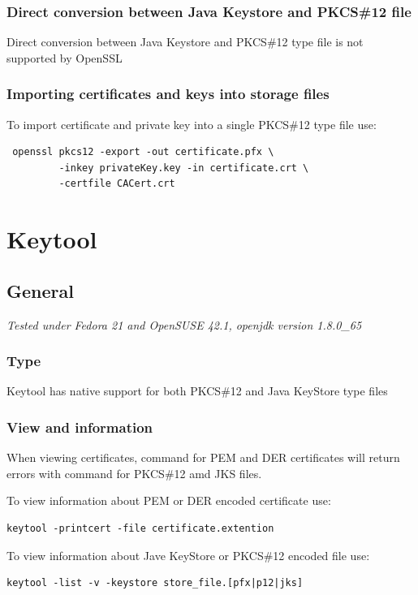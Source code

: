 \documentclass[10pt, a4paper]{report}
\begin{document}
  \subsection{Direct conversion between Java Keystore and PKCS\#12 file}
Direct conversion between Java Keystore and PKCS\#12 type file is not supported by OpenSSL 
  \subsection{Importing certificates and keys into storage files}
To import certificate and private key into a single PKCS\#12 type file use:
\begin{verbatim}
 openssl pkcs12 -export -out certificate.pfx \
         -inkey privateKey.key -in certificate.crt \
         -certfile CACert.crt
\end{verbatim}




\chapter{Keytool}

\section{General}

\textit{Tested under Fedora 21 and OpenSUSE 42.1, openjdk version 1.8.0\_65}

  \subsection{Type}
Keytool has native support for both PKCS\#12 and Java KeyStore type files 
  \subsection{View and information}
When viewing certificates, command for PEM and DER certificates will return errors with command for PKCS\#12 amd JKS files.

To view information about PEM or DER encoded certificate use:
\begin{verbatim}
keytool -printcert -file certificate.extention
\end{verbatim}

To view information about Jave KeyStore or PKCS\#12 encoded file use:
\begin{verbatim}
keytool -list -v -keystore store_file.[pfx|p12|jks]
\end{verbatim}
\end{document}
